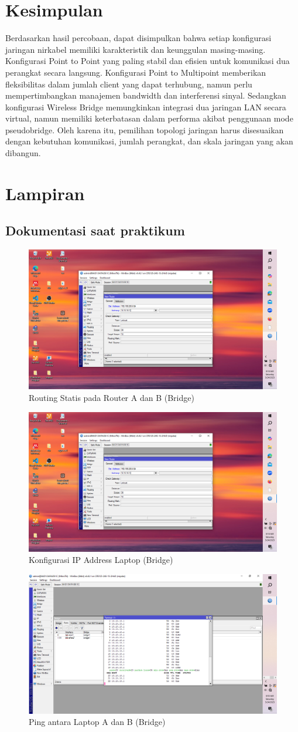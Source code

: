 \section{Kesimpulan}
Berdasarkan hasil percobaan, dapat disimpulkan bahwa setiap konfigurasi jaringan nirkabel memiliki 
karakteristik dan keunggulan masing-masing. Konfigurasi Point to Point yang paling stabil 
dan efisien untuk komunikasi dua perangkat secara langsung. Konfigurasi Point to Multipoint 
memberikan fleksibilitas dalam jumlah client yang dapat terhubung, namun perlu mempertimbangkan 
manajemen bandwidth dan interferensi sinyal. Sedangkan konfigurasi Wireless Bridge memungkinkan 
integrasi dua jaringan LAN secara virtual, namun memiliki keterbatasan dalam performa akibat 
penggunaan mode pseudobridge. Oleh karena itu, pemilihan topologi jaringan harus disesuaikan dengan 
kebutuhan komunikasi, jumlah perangkat, dan skala jaringan yang akan dibangun.

\section{Lampiran}
\subsection{Dokumentasi saat praktikum}
    \begin{figure}[H]
        \centering
        \includegraphics[width=0.5\linewidth]{gambar5.png}
        \caption{Routing Statis pada Router A dan B (Bridge)}
        \label{fig:routing-bridge}
    \end{figure}

    
    \begin{figure}[H]
        \centering
        \includegraphics[width=0.5\linewidth]{gambar5.png}
        \caption{Konfigurasi IP Address Laptop (Bridge)}
        \label{fig:ip-laptop-bridge}
    \end{figure}
    
    
    \begin{figure}[H]
        \centering
        \includegraphics[width=0.5\linewidth]{ping3.png}
        \caption{Ping antara Laptop A dan B (Bridge)}
        \label{fig:ping-bridge}
    \end{figure}


